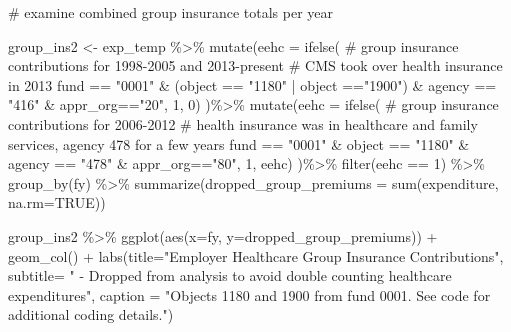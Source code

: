\documentclass[
  letterpaper,
  DIV=11,
  numbers=noendperiod]{scrreport}
\newenvironment{Shaded}{\begin{snugshade}}{\end{snugshade}}
\newcommand{\AttributeTok}[1]{\textcolor[rgb]{0.40,0.45,0.13}{#1}}
\newcommand{\CommentTok}[1]{\textcolor[rgb]{0.37,0.37,0.37}{#1}}
\newcommand{\ConstantTok}[1]{\textcolor[rgb]{0.56,0.35,0.01}{#1}}
\newcommand{\DecValTok}[1]{\textcolor[rgb]{0.68,0.00,0.00}{#1}}
\newcommand{\FunctionTok}[1]{\textcolor[rgb]{0.28,0.35,0.67}{#1}}
\newcommand{\NormalTok}[1]{\textcolor[rgb]{0.00,0.23,0.31}{#1}}
\newcommand{\OtherTok}[1]{\textcolor[rgb]{0.00,0.23,0.31}{#1}}
\newcommand{\SpecialCharTok}[1]{\textcolor[rgb]{0.37,0.37,0.37}{#1}}
\newcommand{\StringTok}[1]{\textcolor[rgb]{0.13,0.47,0.30}{#1}}
\begin{document}
\begin{Shaded}
\begin{Highlighting}[]
\CommentTok{\# examine combined group insurance totals per year}

\NormalTok{group\_ins2 }\OtherTok{\textless{}{-}}\NormalTok{ exp\_temp }\SpecialCharTok{\%\textgreater{}\%} 
  \FunctionTok{mutate}\NormalTok{(}\AttributeTok{eehc =} \FunctionTok{ifelse}\NormalTok{(}
    \CommentTok{\# group insurance contributions for 1998{-}2005 and 2013{-}present}
    \CommentTok{\# CMS took over health insurance in 2013}
\NormalTok{   fund }\SpecialCharTok{==} \StringTok{"0001"} \SpecialCharTok{\&}\NormalTok{ (object }\SpecialCharTok{==} \StringTok{"1180"} \SpecialCharTok{|}\NormalTok{ object }\SpecialCharTok{==}\StringTok{"1900"}\NormalTok{) }\SpecialCharTok{\&}\NormalTok{ agency }\SpecialCharTok{==} \StringTok{"416"} \SpecialCharTok{\&}\NormalTok{ appr\_org}\SpecialCharTok{==}\StringTok{"20"}\NormalTok{, }\DecValTok{1}\NormalTok{, }\DecValTok{0}\NormalTok{) )}\SpecialCharTok{\%\textgreater{}\%} 
  \FunctionTok{mutate}\NormalTok{(}\AttributeTok{eehc =} \FunctionTok{ifelse}\NormalTok{(}
    \CommentTok{\# group insurance contributions for 2006{-}2012}
    \CommentTok{\# health insurance was in healthcare and family services, agency 478 for a few years}
\NormalTok{    fund }\SpecialCharTok{==} \StringTok{"0001"} \SpecialCharTok{\&}\NormalTok{ object }\SpecialCharTok{==} \StringTok{"1180"} \SpecialCharTok{\&}\NormalTok{ agency }\SpecialCharTok{==} \StringTok{"478"} \SpecialCharTok{\&}\NormalTok{ appr\_org}\SpecialCharTok{==}\StringTok{"80"}\NormalTok{, }\DecValTok{1}\NormalTok{, eehc) )}\SpecialCharTok{\%\textgreater{}\%}
  \FunctionTok{filter}\NormalTok{(eehc }\SpecialCharTok{==} \DecValTok{1}\NormalTok{) }\SpecialCharTok{\%\textgreater{}\%} 
    \FunctionTok{group\_by}\NormalTok{(fy) }\SpecialCharTok{\%\textgreater{}\%} 
    \FunctionTok{summarize}\NormalTok{(}\AttributeTok{dropped\_group\_premiums =} \FunctionTok{sum}\NormalTok{(expenditure, }\AttributeTok{na.rm=}\ConstantTok{TRUE}\NormalTok{))}

\NormalTok{group\_ins2 }\SpecialCharTok{\%\textgreater{}\%} \FunctionTok{ggplot}\NormalTok{(}\FunctionTok{aes}\NormalTok{(}\AttributeTok{x=}\NormalTok{fy, }\AttributeTok{y=}\NormalTok{dropped\_group\_premiums)) }\SpecialCharTok{+} 
  \FunctionTok{geom\_col}\NormalTok{() }\SpecialCharTok{+} 
  \FunctionTok{labs}\NormalTok{(}\AttributeTok{title=}\StringTok{"Employer Healthcare Group Insurance Contributions"}\NormalTok{, }
       \AttributeTok{subtitle=} \StringTok{" {-} Dropped from analysis to avoid double counting healthcare expenditures"}\NormalTok{, }
       \AttributeTok{caption =} \StringTok{"Objects 1180 and 1900 from fund 0001. See code for additional coding details."}\NormalTok{)}
\end{Highlighting}
\end{Shaded}
\end{document}
